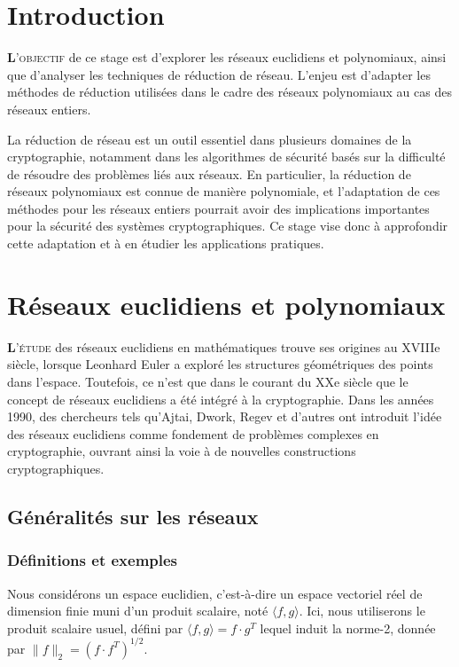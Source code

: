 \documentclass[a4paper,12pt]{report}  %
\theoremstyle{definitionstyle}
\theoremstyle{examplestyle}
\theoremstyle{remarkstyle}
\theoremstyle{propositionstyle}
\theoremstyle{theoremstyle}
\begin{document}
	
	\chapter*{Introduction}
	
	\lettrine{\textbf{L}}{'objectif} de ce stage est d'explorer les réseaux euclidiens et polynomiaux, ainsi que d'analyser les techniques de réduction de réseau. L'enjeu est d'adapter les méthodes de réduction utilisées dans le cadre des réseaux polynomiaux au cas des réseaux entiers.
	
	La réduction de réseau est un outil essentiel dans plusieurs domaines de la cryptographie, notamment dans les algorithmes de sécurité basés sur la difficulté de résoudre des problèmes liés aux réseaux. En particulier, la réduction de réseaux polynomiaux est connue de manière polynomiale, et l'adaptation de ces méthodes pour les réseaux entiers pourrait avoir des implications importantes pour la sécurité des systèmes cryptographiques. Ce stage vise donc à approfondir cette adaptation et à en étudier les applications pratiques.	
	
	\chapter{Réseaux euclidiens et polynomiaux}
	
	\lettrine{\textbf{L}}{'étude} des réseaux euclidiens en mathématiques trouve ses origines au XVIIIe siècle, lorsque Leonhard Euler a exploré les structures géométriques des points dans l'espace. Toutefois, ce n'est que dans le courant du XXe siècle que le concept de réseaux euclidiens a été intégré à la cryptographie. Dans les années 1990, des chercheurs tels qu'Ajtai, Dwork, Regev et d'autres ont introduit l'idée des réseaux euclidiens comme fondement de problèmes complexes en cryptographie, ouvrant ainsi la voie à de nouvelles constructions cryptographiques.
	
	\section{Généralités sur les réseaux}
	
	
	\subsection{Définitions et exemples}
	Nous considérons un espace euclidien, c'est-à-dire un espace vectoriel réel de dimension finie muni d'un produit scalaire, noté $\langle f, g \rangle$. Ici, nous utiliserons le produit scalaire usuel, défini par $\langle f, g \rangle = f \cdot g^T$ lequel induit la norme-2, donnée par $\|f\|_2=(f \cdot f^T)^{1/2}$.
	
\end{document}
